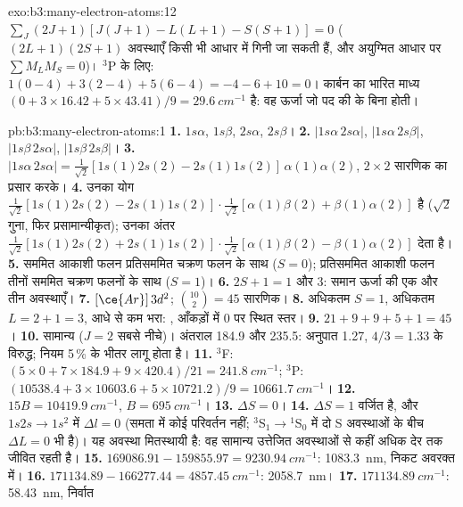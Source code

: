 \begin{solution}{exo:b3:many-electron-atoms:12}
$\sum_J(2J+1)[J(J+1) - L(L+1) - S(S+1)] = 0$ ($(2L+1)(2S+1)$ अवस्थाएँ
किसी भी आधार में गिनी जा सकती हैं, और अयुग्मित आधार पर $\sum M_LM_S = 0$)।
${}^3$P के लिए: $1(0 - 4) + 3(2 - 4) + 5(6 - 4) = -4 - 6 + 10 = 0$। कार्बन का
भारित माध्य $(0 + 3 \times 16.42 + 5 \times 43.41)/9 = \qty{29.6}{cm^{-1}}$ है:
वह ऊर्जा जो पद की  के बिना होती।
\end{solution}

\begin{solution}{pb:b3:many-electron-atoms:1}
\textbf{1.} $1s\alpha$, $1s\beta$, $2s\alpha$, $2s\beta$।
\textbf{2.} $|1s\alpha\,2s\alpha|$, $|1s\alpha\,2s\beta|$, $|1s\beta\,2s\alpha|$,
$|1s\beta\,2s\beta|$।
\textbf{3.} $|1s\alpha\,2s\alpha| = \frac{1}{\sqrt2}[1s(1)2s(2) - 2s(1)1s(2)]\,
\alpha(1)\alpha(2)$, $2\times2$ सारणिक का प्रसार करके।
\textbf{4.} उनका योग $\frac{1}{\sqrt2}[1s(1)2s(2) - 2s(1)1s(2)]\cdot
\frac{1}{\sqrt2}[\alpha(1)\beta(2) + \beta(1)\alpha(2)]$ है ($\sqrt2$ गुना, फिर
प्रसामान्यीकृत); उनका अंतर $\frac{1}{\sqrt2}[1s(1)2s(2) +
2s(1)1s(2)]\cdot\frac{1}{\sqrt2}[\alpha(1)\beta(2) - \beta(1)\alpha(2)]$ देता है।
\textbf{5.} सममित आकाशी फलन प्रतिसममित चक्रण फलन के साथ ($S = 0$);
प्रतिसममित आकाशी फलन तीनों सममित चक्रण फलनों के साथ ($S = 1$)।
\textbf{6.} $2S + 1 = 1$ और 3: समान ऊर्जा की एक और तीन अवस्थाएँ।
\textbf{7.} $[\ce{Ar}]\,3d^2$; $\binom{10}{2} = 45$ सारणिक।
\textbf{8.} अधिकतम $S = 1$, अधिकतम $L = 2 + 1 = 3$, आधे से कम भरा:
, आँकड़ों में 0 पर स्थित स्तर।
\textbf{9.} $21 + 9 + 9 + 5 + 1 = 45$।
\textbf{10.} सामान्य ($J = 2$ सबसे नीचे)। अंतराल 184.9 और 235.5: अनुपात 1.27,
$4/3 = 1.33$ के विरुद्ध; नियम 5\,\% के भीतर लागू होता है।
\textbf{11.} ${}^3$F: $(5 \times 0 + 7 \times 184.9 + 9 \times 420.4)/21 =
\qty{241.8}{cm^{-1}}$; ${}^3$P: $(10538.4 + 3 \times 10603.6 + 5 \times
10721.2)/9 = \qty{10661.7}{cm^{-1}}$।
\textbf{12.} $15B = \qty{10419.9}{cm^{-1}}$, $B = \qty{695}{cm^{-1}}$।
\textbf{13.} $\Delta S = 0$।
\textbf{14.} $\Delta S = 1$ वर्जित है, और $1s2s \to 1s^2$ में $\Delta l = 0$
(समता में कोई परिवर्तन नहीं; ${}^3$S$_1 \to {}^1$S$_0$ में दो S
अवस्थाओं के बीच $\Delta L = 0$ भी है)। यह अवस्था मितस्थायी है: वह सामान्य उत्तेजित
अवस्थाओं से कहीं अधिक देर तक जीवित रहती है।
\textbf{15.} $169086.91 - 159855.97 = \qty{9230.94}{cm^{-1}}$: \qty{1083.3}{nm},
निकट अवरक्त में।
\textbf{16.} $171134.89 - 166277.44 = \qty{4857.45}{cm^{-1}}$: \qty{2058.7}{nm}।
\textbf{17.} $\qty{171134.89}{cm^{-1}}$: \qty{58.43}{nm}, निर्वात

\end{solution}
